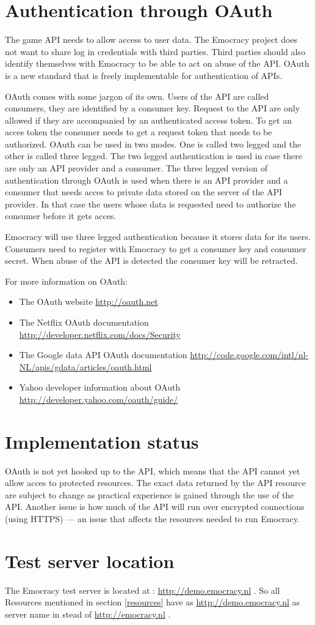\documentclass[a4paper]{report}
\begin{document}
\section{Authentication through OAuth}
The game API needs to allow access to user data. The Emocracy project does not 
want to share log in credentials with third parties. Third parties should also 
identify themselves with Emocracy to be able to act on abuse of the API. OAuth 
is a new standard that is freely implementable for authentication of APIs. 

OAuth comes with some jargon of its own. Users of the API are called consumers, 
they are identified by a consumer key. Request to the API are only allowed if
they are accompanied by an authenticated access token. To get an acces token the
consumer needs to get a request token that needs to be authorized. OAuth can be 
used in two modes. One is called two legged and the other is called three 
legged. The two legged authentication is used in case there are only an API 
provider and a consumer. The three legged version of authentication through 
OAuth is used when there is an API provider and a consumer that needs acces to
private data stored on the server of the API provider. In that case the users 
whose data is requested need to authorize the consumer before it gets acces.

Emocracy will use three legged authentication because it stores data for its 
users. Consumers need to register with Emocracy to get a consumer key and 
consumer secret. When abuse of the API is detected the consumer key will be 
retracted. 

For more information on OAuth:
\begin{itemize}
    \item{The OAuth website \url{http://oauth.net}}
    \item{The Netflix OAuth documentation \url{http://developer.netflix.com/docs/Security}}
    \item{The Google data API OAuth documentation \url{http://code.google.com/intl/nl-NL/apis/gdata/articles/oauth.html}}
    \item{Yahoo developer information about OAuth \url{http://developer.yahoo.com/oauth/guide/}}
\end{itemize}

\section{Implementation status}
OAuth is not yet hooked up to the API, which means that the API cannot yet allow
acces to protected resources. The exact data returned by the API resource are 
subject to change as practical experience is gained through the use of the API.
Another issue is how much of the API will run over encrypted connections (using
HTTPS) --- an issue that affects the resources needed to run Emocracy.
\section{Test server location}
The Emocracy test server is located at : \url{http://demo.emocracy.nl} . So all
Resources mentioned in section \ref{resources} have as \url{http://demo.emocracy.nl}
as server name in stead of \url{http://emocracy.nl} .
\end{document}
